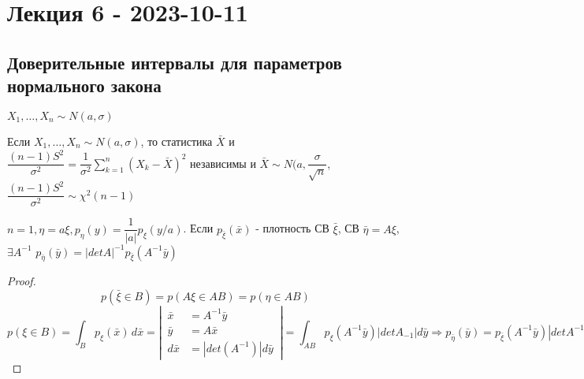 \chapter{Лекция 6 - 2023-10-11}

\section{Доверительные интервалы для параметров нормального закона}

$X_1, \dots, X_n \sim N(a, \sigma)$

\begin{theorem}
  Если $X_1, \dots, X_n \sim N(a, \sigma)$, то статистика $\bar X$ и $\dfrac{(n-1) S^2}{\sigma^2} = \dfrac{1}{\sigma^2} \sum\limits_{k=1}^n (X_k-\bar X)^2$ независимы и $\bar X \sim N(a, \dfrac{\sigma}{\sqrt{n}}$, $\dfrac{(n-1) S^2}{\sigma^2} \sim \chi^2(n-1)$
\end{theorem}

\begin{theorem}[Лемма]
  $n = 1, \eta = a \xi, p_\eta(y) = \dfrac{1}{|a|} p_\xi(y/a)$.
  Если $p_{\bar \xi} (\bar x)$ - плотность СВ $\bar\xi$, СВ $\bar\eta = A\xi$, $\exists A^{-1}$
  $p_{\bar\eta} (\bar y) = |det A|^{-1} p_{\bar\xi} (A^{-1} \bar y)$
\end{theorem}
\begin{proof}
  $$p(\bar\xi \in B) = p(A\xi \in AB) = p(\eta \in AB)$$
  $$ p(\xi \in B) = \int_B p_\xi (\bar x) \, d\bar x
  = \left|\, \begin{aligned}
    \bar x &= A^{-1} \bar y \\
    \bar y &= A \bar x \\
    d\bar x &= |det(A^{-1})| d\bar y
  \end{aligned} \,\right| 
  = \int_{AB} p_\xi(A^{-1} \bar y) |det A_{-1}| d\bar y 
  \Rightarrow p_{\bar \eta} (\bar y)
  = p_{\bar\xi} (A^{-1} \bar y) |det A^{-1}|$$
\end{proof}


